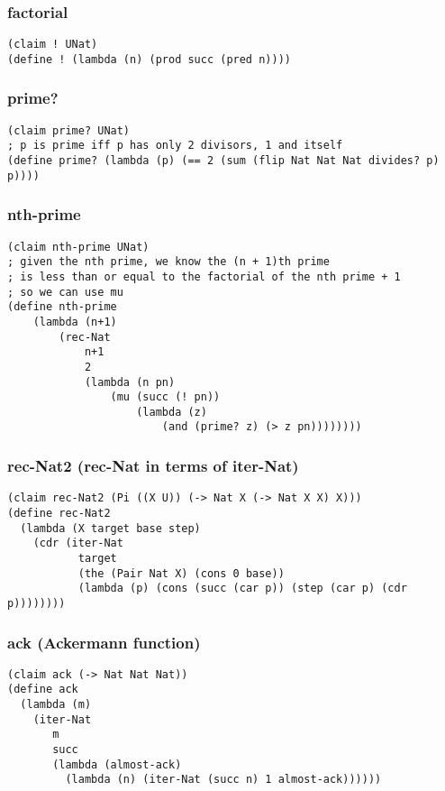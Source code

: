 \subsubsection{factorial} \label{code:factorial}
\begin{verbatim}
(claim ! UNat)
(define ! (lambda (n) (prod succ (pred n))))
\end{verbatim}

\subsubsection{prime?} \label{code:prime?}
\begin{verbatim}
(claim prime? UNat)
; p is prime iff p has only 2 divisors, 1 and itself
(define prime? (lambda (p) (== 2 (sum (flip Nat Nat Nat divides? p) p))))
\end{verbatim}

\subsubsection{nth-prime} \label{code:nth-prime}
\begin{verbatim}
(claim nth-prime UNat)
; given the nth prime, we know the (n + 1)th prime
; is less than or equal to the factorial of the nth prime + 1
; so we can use mu
(define nth-prime
    (lambda (n+1)
        (rec-Nat
            n+1
            2
            (lambda (n pn) 
                (mu (succ (! pn)) 
                    (lambda (z) 
                        (and (prime? z) (> z pn))))))))
\end{verbatim}

\subsubsection{rec-Nat2 (rec-Nat in terms of iter-Nat)} \label{code:rec-Nat2}
\begin{verbatim}
(claim rec-Nat2 (Pi ((X U)) (-> Nat X (-> Nat X X) X)))
(define rec-Nat2
  (lambda (X target base step)
    (cdr (iter-Nat
           target
           (the (Pair Nat X) (cons 0 base))
           (lambda (p) (cons (succ (car p)) (step (car p) (cdr p))))))))
\end{verbatim}

\subsubsection{ack (Ackermann function)} \label{code:ack}
\begin{verbatim}
(claim ack (-> Nat Nat Nat))
(define ack
  (lambda (m)
    (iter-Nat
       m
       succ
       (lambda (almost-ack)
         (lambda (n) (iter-Nat (succ n) 1 almost-ack))))))
\end{verbatim}


